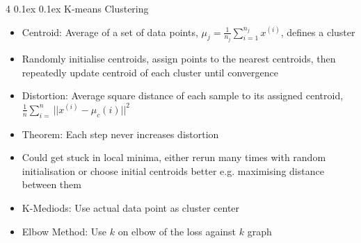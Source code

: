 \documentclass[10pt, landscape]{article}
\makeatletter
\renewcommand{\subsection}{\@startsection{subsection}{2}{0mm}%
  {0.1ex} %
  {0.1ex} %
  {\normalfont\normalsize\bfseries}}
\makeatother
\begin{document}
\begin{multicols*}{4}
\subsection{K-means Clustering}
\begin{itemize}
    \item Centroid: Average of a set of data points, $\mu_j=\frac{1}{n_j}\sum_{i=1}^{n_j}x^{(i)}$, defines a cluster
    \item Randomly initialise centroids, assign points to the nearest centroids, then repeatedly update centroid of each cluster until convergence
    \item Distortion: Average square distance of each sample to its assigned centroid, $\frac{1}{n}\sum_{i=}^n||x^{(i)}-\mu_c(i)||^2$
    \item Theorem: Each step never increases distortion
    \item Could get stuck in local minima, either rerun many times with random initialisation or choose initial centroids better e.g. maximising distance between them
    \item K-Mediods: Use actual data point as cluster center
    \item Elbow Method: Use $k$ on elbow of the loss against $k$ graph
\end{itemize}


\end{multicols*}
\end{document}
